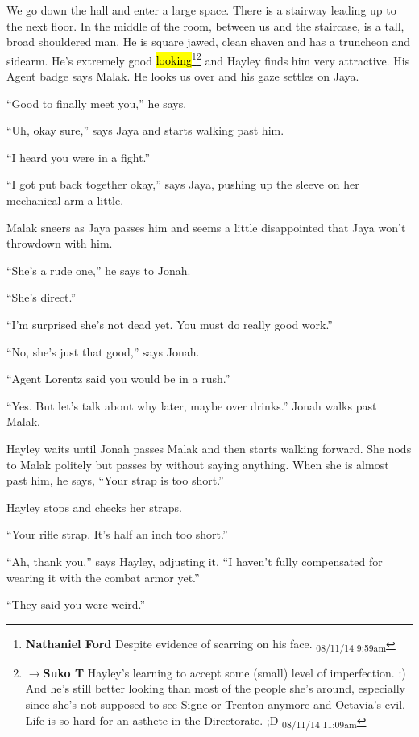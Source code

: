 We go down the hall and enter a large space. There is a stairway leading up to the next floor.  In the middle of the room, between us and the staircase, is a tall, broad shouldered man.  He is square jawed, clean shaven and has a truncheon and sidearm.  He's extremely good \hl{looking}\footnote{\textbf{Nathaniel Ford }Despite evidence of scarring on his face. \textsubscript{08/11/14 9:59am}}\footnote{$\rightarrow$\textbf{Suko T }Hayley's learning to accept some (small) level of imperfection. :)  And he's still better looking than most of the people she's around, especially since she's not supposed to see Signe or Trenton anymore and Octavia's evil.  Life is so hard for an asthete in the Directorate. ;D \textsubscript{08/11/14 11:09am}} and Hayley finds him very attractive.  His Agent badge says Malak.  He looks us over and his gaze settles on Jaya.

``Good to finally meet you,'' he says.

``Uh, okay sure,'' says Jaya and starts walking past him.

``I heard you were in a fight.''

``I got put back together okay,'' says Jaya, pushing up the sleeve on her mechanical arm a little.

Malak sneers as Jaya passes him and seems a little disappointed that Jaya won't throwdown with him.

``She's a rude one,'' he says to Jonah.

``She's direct.''

``I'm surprised she's not dead yet.  You must do really good work.''

``No, she's just that good,'' says Jonah.

``Agent Lorentz said you would be in a rush.''

``Yes.  But let's talk about why later, maybe over drinks.''  Jonah walks past Malak.

Hayley waits until Jonah passes Malak and then starts walking forward.  She nods to Malak politely but passes by without saying anything.  When she is almost past him, he says, ``Your strap is too short.''

Hayley stops and checks her straps.

``Your rifle strap.  It's half an inch too short.''

``Ah, thank you,'' says Hayley, adjusting it.  ``I haven't fully compensated for wearing it with the combat armor yet.''

``They said you were weird.''

